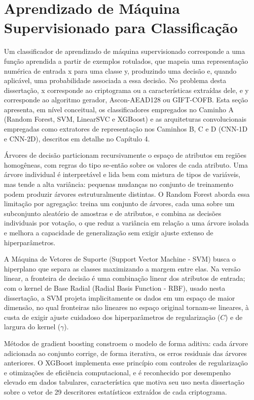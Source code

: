 \section{Aprendizado de Máquina Supervisionado para Classificação}

Um classificador de aprendizado de máquina supervisionado corresponde a uma função aprendida a partir de exemplos rotulados, que mapeia uma representação numérica de entrada x para uma classe y, produzindo uma decisão e, quando aplicável, uma probabilidade associada a essa decisão. No problema desta dissertação, x corresponde ao criptograma ou a características extraídas dele, e y corresponde ao algoritmo gerador, Ascon-AEAD128 ou GIFT-COFB. Esta seção apresenta, em nível conceitual, os classificadores empregados no Caminho A (Random Forest, SVM, LinearSVC e XGBoost) e as arquiteturas convolucionais empregadas como extratores de representação nos Caminhos B, C e D (CNN-1D e CNN-2D), descritos em detalhe no Capítulo 4.

Árvores de decisão particionam recursivamente o espaço de atributos em regiões homogêneas, com regras do tipo se-então sobre os valores de cada atributo. Uma árvore individual é interpretável e lida bem com mistura de tipos de variáveis, mas tende a alta variância: pequenas mudanças no conjunto de treinamento podem produzir árvores estruturalmente distintas. O Random Forest aborda essa limitação por agregação: treina um conjunto de árvores, cada uma sobre um subconjunto aleatório de amostras e de atributos, e combina as decisões individuais por votação, o que reduz a variância em relação a uma árvore isolada e melhora a capacidade de generalização sem exigir ajuste extenso de hiperparâmetros.

A Máquina de Vetores de Suporte (Support Vector Machine - SVM) busca o hiperplano que separa as classes maximizando a margem entre elas. Na versão linear, a fronteira de decisão é uma combinação linear dos atributos de entrada; com o kernel de Base Radial (Radial Basis Function - RBF), usado nesta dissertação, a SVM projeta implicitamente os dados em um espaço de maior dimensão, no qual fronteiras não lineares no espaço original tornam-se lineares, à custa de exigir ajuste cuidadoso dos hiperparâmetros de regularização ($C$) e de largura do kernel ($\gamma$).

Métodos de gradient boosting constroem o modelo de forma aditiva: cada árvore adicionada ao conjunto corrige, de forma iterativa, os erros residuais das árvores anteriores. O XGBoost implementa esse princípio com controles de regularização e otimizações de eficiência computacional, e é reconhecido por desempenho elevado em dados tabulares, característica que motiva seu uso nesta dissertação sobre o vetor de 29 descritores estatísticos extraídos de cada criptograma.

